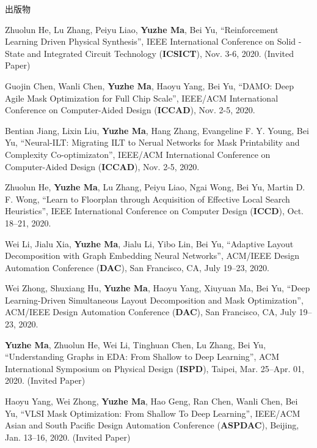 \begin{rSection}{出版物}
\begin{description}[font=\normalfont]
\item[{[C19]}]{
    Zhuolun He, Lu Zhang, Peiyu Liao, \textbf{Yuzhe Ma}, Bei Yu,
    ``Reinforcement Learning Driven Physical Synthesis'',
    IEEE International Conference on Solid -State and Integrated Circuit Technology (\textbf{ICSICT}), Nov. 3-6, 2020. (Invited Paper)
}

\item[{[C18]}]{
    Guojin Chen, Wanli Chen, \textbf{Yuzhe Ma}, Haoyu Yang, Bei Yu,
    ``DAMO: Deep Agile Mask Optimization for Full Chip Scale'',
    IEEE/ACM International Conference on Computer-Aided Design (\textbf{ICCAD}), Nov. 2-5, 2020.
}

\item[{[C17]}]{
    Bentian Jiang, Lixin Liu, \textbf{Yuzhe Ma}, Hang Zhang, Evangeline F. Y. Young, Bei Yu,
    ``Neural-ILT: Migrating ILT to Nerual Networks for Mask Printability and Complexity Co-optimizaton'',
    IEEE/ACM International Conference on Computer-Aided Design (\textbf{ICCAD}), Nov. 2-5, 2020.
}

\item[{[C16]}]{
    Zhuolun He, \textbf{Yuzhe Ma}, Lu Zhang, Peiyu Liao, Ngai Wong, Bei Yu, Martin D. F. Wong,
    ``Learn to Floorplan through Acquisition of Effective Local Search Heuristics'',
    IEEE International Conference on Computer Design (\textbf{ICCD}), Oct. 18–21, 2020.
}

\item[{[C15]}]{
    Wei Li, Jialu Xia, \textbf{Yuzhe Ma}, Jialu Li, Yibo Lin, Bei Yu,
    ``Adaptive Layout Decomposition with Graph Embedding Neural Networks'',
    ACM/IEEE Design Automation Conference (\textbf{DAC}), San Francisco, CA, July 19–23, 2020.
}

\item[{[C14]}]{
    Wei Zhong, Shuxiang Hu, \textbf{Yuzhe Ma}, Haoyu Yang, Xiuyuan Ma, Bei Yu,
    ``Deep Learning-Driven Simultaneous Layout Decomposition and Mask Optimization'',
    ACM/IEEE Design Automation Conference (\textbf{DAC}), San Francisco, CA, July 19–23, 2020.
}

\item[{[C13]}]{
    \textbf{Yuzhe Ma}, Zhuolun He, Wei Li, Tinghuan Chen, Lu Zhang, Bei Yu,
    ``Understanding Graphs in EDA: From Shallow to Deep Learning'',
    ACM International Symposium on Physical Design (\textbf{ISPD}), Taipei, Mar. 25–Apr. 01, 2020. (Invited Paper)
}

\item[{[C12]}]{
    Haoyu Yang, Wei Zhong, \textbf{Yuzhe Ma}, Hao Geng, Ran Chen, Wanli Chen, Bei Yu,
    ``VLSI Mask Optimization: From Shallow To Deep Learning'',
    IEEE/ACM Asian and South Pacific Design Automation Conference (\textbf{ASPDAC}), Beijing, Jan. 13--16, 2020. (Invited Paper)
}


\end{description}
\end{rSection}
